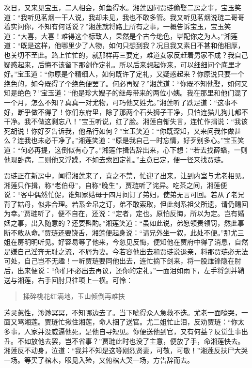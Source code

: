 \documentclass[12pt,oneside]{book}
\newenvironment{shici}{%
\begin{verse}%
\centering\large\hspace{12pt}}%
{\end{verse}}
\begin{document}
次日，又来见宝玉，二人相会，如鱼得水。湘莲因问贾琏偷娶二房之事，宝玉笑道：“我听见茗烟一干人说，我却未见，我也不敢多管。我又听见茗烟说琏二哥哥着实问你，不知有何话说？”湘莲就将路上所有之事，一概告诉宝玉，宝玉笑道：“大喜，大喜！难得这个标致人，果然是个古今绝色，堪配你之为人。”湘莲道：“既是这样，他哪里少了人物，如何只想到我？况且我又素日不甚和他相厚，也关切不至此。路上忙忙的，就那样再三要定，难道女家反赶着男家不成？我自己疑惑起来，后悔不该留下那剑作定礼。所以后来想起你来，可以细细问个底里才好。”宝玉道：“你原是个精细人，如何既许了定礼，又疑惑起来？你原说只要一个绝色的，如今既得了个绝色便罢了。何必再疑？”湘莲道：“你既不知他娶，如何又知是绝色？”宝玉道：“他是珍大嫂子的继母带来的两位小姨。我在那里和他们混了一个月，怎么不知？真真一对尤物，可巧他又姓尤。”湘莲听了跌足道：“这事不好，断乎做不得了！你们东府里，除了那两个石头狮子干净，只怕连猫儿狗儿都不干净。我不做这剩忘八！”宝玉听说，红了脸。湘莲自惭失言，连忙作揖说：“我该死胡说！你好歹告诉我，他品行如何？”宝玉笑道：“你既深知，又来问我作做甚么？连我也未必干净了。”湘莲笑道：“原是我自己一时忘情，好歹别多心。”宝玉笑道：“何必再提，这倒似有心了。”湘莲作揖告辞出来，心下想：“若去找薛蟠，一则他现卧病，二则他又浮躁，不如去索回定礼。”主意已定，便一径来找贾琏。

贾琏正在新房中，闻得湘莲来了，喜之不禁，忙迎了出来，让到内室与尤老相见。湘莲只作揖，称“老伯母”，自称“晚生”，贾琏听了诧异。吃茶之间，湘莲便说：“客中偶然忙促，谁知家姑母于四月间订了弟妇，使弟无言可回。若从了老兄背了姑母，似非合理。若系金帛之订，弟不敢索取，但此剑系祖父所遗，请仍赐回为幸。”贾琏听了，便不自在，还说：“定者，定也。原怕反悔，所以为定。岂有婚姻之事，出入随意的？还要斟酌。”湘莲笑道：“虽如此说，弟愿领责领罚，然此事断不敢从命。”贾琏还要饶舌，湘莲便起身说：“请兄外坐一叙，此处不便。”那尤三姐在房明明听见。好容易等了他来，今忽见反悔，便知他在贾府中得了消息，自然是嫌自己淫奔无耻之流，不屑为妻。今若容他出去和贾琏说退亲，料那贾琏必无法可处，自己岂不无趣！一听贾琏要同他出去，连忙摘下剑来，将一股雌锋隐在肘后，出来便说：“你们不必出去再议，还你的定礼。”一面泪如雨下，左手将剑并鞘送与湘莲，右手回肘只往项上一横。可怜：

\begin{shici}
揉碎桃花红满地，玉山倾倒再难扶
\end{shici}


芳灵蕙性，渺渺冥冥，不知哪边去了。当下唬得众人急救不迭。尤老一面嚎哭，一面又骂湘莲。贾琏忙揪住湘莲，命人捆了送官。尤二姐忙止泪，反劝贾琏：“你太多事，人家并没威逼他死，是他自寻短见。你便送他到官，又有何益？反觉生事出丑。不如放他去罢，岂不省事？”贾琏此时也没了主意，便放了手，命湘莲快去。湘莲反不动身，泣道：“我并不知是这等刚烈贤妻，可敬，可敬！”湘莲反扶尸大哭一场。等买了棺木，眼见入殓，又俯棺大哭一场，方告辞而去。
\end{document}
